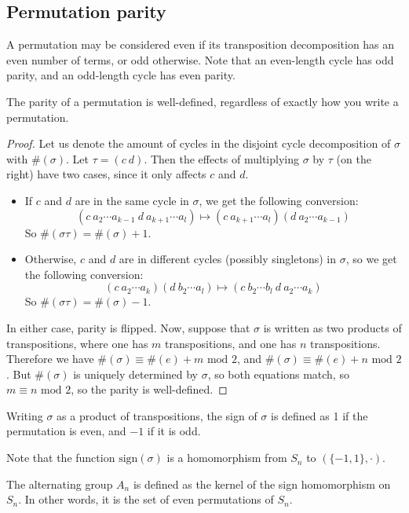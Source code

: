 \subsection{Permutation parity}
A permutation may be considered even if its transposition decomposition has an even number of terms, or odd otherwise.
Note that an even-length cycle has odd parity, and an odd-length cycle has even parity.
\begin{proposition}
	The parity of a permutation is well-defined, regardless of exactly how you write a permutation.
\end{proposition}
\begin{proof}
	Let us denote the amount of cycles in the disjoint cycle decomposition of \(\sigma\) with \(\#(\sigma)\).
	Let \(\tau = (c\ d)\).
	Then the effects of multiplying \(\sigma\) by \(\tau\) (on the right) have two cases, since it only affects \(c\) and \(d\).
	\begin{itemize}
		\item If \(c\) and \(d\) are in the same cycle in \(\sigma\), we get the following conversion:
		      \[
			      (c\ a_2 \cdots a_{k-1}\ d\ a_{k+1} \cdots a_l) \mapsto (c\ a_{k+1} \cdots a_l) (d\ a_2 \cdots a_{k-1})
		      \]
		      So \(\#(\sigma\tau) = \#(\sigma) + 1\).
		\item Otherwise, \(c\) and \(d\) are in different cycles (possibly singletons) in \(\sigma\), so we get the following conversion:
		      \[
			      (c\ a_2 \cdots a_k) (d\ b_2 \cdots a_l) \mapsto (c\ b_2 \cdots b_l\ d\ a_2 \cdots a_k)
		      \]
		      So \(\#(\sigma\tau) = \#(\sigma) - 1\).
	\end{itemize}
	In either case, parity is flipped.
	Now, suppose that \(\sigma\) is written as two products of transpositions, where one has \(m\) transpositions, and one has \(n\) transpositions.
	Therefore we have \(\#(\sigma) \equiv \#(e) + m \text{ mod } 2\), and \(\#(\sigma) \equiv \#(e) + n \text{ mod } 2\).
	But \(\#(\sigma)\) is uniquely determined by \(\sigma\), so both equations match, so \(m \equiv n \text{ mod } 2\), so the parity is well-defined.
\end{proof}

\begin{definition}
	Writing \(\sigma\) as a product of transpositions, the sign of \(\sigma\) is defined as 1 if the permutation is even, and \(-1\) if it is odd.
\end{definition}
Note that the function \(\mathrm{sign}(\sigma)\) is a homomorphism from \(S_n\) to \((\{-1, 1\}, \cdot)\).

\begin{definition}
	The alternating group \(A_n\) is defined as the kernel of the sign homomorphism on \(S_n\).
	In other words, it is the set of even permutations of \(S_n\).
\end{definition}

